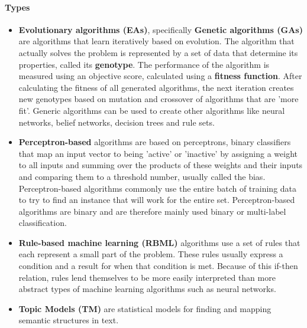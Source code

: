 \paragraph{Types}
\begin{itemize}
	\item \textbf{Evolutionary algorithms (EAs)},
		specifically \textbf{Genetic algorithms (GAs)} are algorithms that learn iteratively based on evolution. The algorithm that actually solves the problem is represented by a set of data that determine its properties, called its \textbf{genotype}. The performance of the algorithm is measured using an objective score, calculated using a \textbf{fitness function}. After calculating the fitness of all generated algorithms, the next iteration creates new genotypes based on mutation and crossover of algorithms that are 'more fit'. Generic algorithms can be used to create other algorithms like neural networks, belief networks, decision trees and rule sets.
	\item \textbf{Perceptron-based}
		algorithms are based on perceptrons, binary classifiers that map an input vector to being 'active' or 'inactive' by assigning a weight to all inputs and summing over the products of these weights and their inputs and comparing them to a threshold number, usually called the bias. Perceptron-based algorithms commonly use the entire batch of training data to try to find an instance that will work for the entire set. Perceptron-based algorithms are binary and are therefore mainly used binary or multi-label classification.
	\item \textbf{Rule-based machine learning (RBML)}
		algorithms use a set of rules that each represent a small part of the problem. These rules usually express a condition and a result for when that condition is met. Because of this if-then relation, rules lend themselves to be more easily interpreted than more abstract types of machine learning algorithms such as neural networks.
	\item \textbf{Topic Models (TM)}
		are statistical models for finding and mapping semantic structures in text.
\end{itemize}

